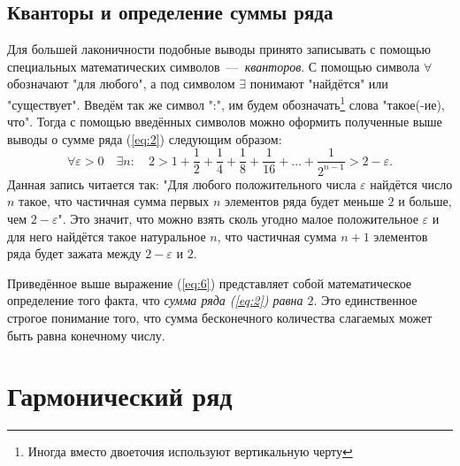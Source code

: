 \documentclass[12pt]{article}
\begin{document}
\subsection{Кванторы и определение суммы ряда}
Для большей лаконичности подобные выводы принято записывать с помощью специальных математических символов~\----~\emph{кванторов}. С помощью символа $\forall$ обозначают "для любого"{}, а под символом $\exists$ понимают "найдётся"{} или "существует"{}. Введём так же символ ":"{}, им будем обозначать\footnote{Иногда вместо двоеточия используют вертикальную черту} слова "такое(\--ие), что"{}. Тогда с помощью введённых символов можно оформить полученные выше выводы о сумме ряда (\ref{eq:2}) следующим образом:
\begin{equation}\label{eq:6}
    \forall \varepsilon > 0 \quad \exists n: \quad 2 > 1 + \dfrac{1}{2} + \dfrac14 + \dfrac18 + \dfrac{1}{16} + \ldots + \dfrac1{2^{n-1}} > 2 - \varepsilon.
\end{equation}
Данная запись читается так: "Для любого положительного числа $\varepsilon$ найдётся число $n$ такое, что частичная сумма первых $n$ элементов ряда будет меньше $2$ и больше, чем $2-\varepsilon$"{}. Это значит, что можно взять сколь угодно малое положительное $\varepsilon$ и для него найдётся такое натуральное $n$, что частичная сумма $n+1$ элементов ряда будет зажата между $2-\varepsilon$ и $2$.
\par
Приведённое выше выражение (\ref{eq:6}) представляет собой математическое определение того факта, что \emph{сумма ряда (\ref{eq:2}) равна $2$}. Это единственное строгое понимание того, что сумма бесконечного количества слагаемых может быть равна конечному числу.
\section{Гармонический ряд}
\end{document}
